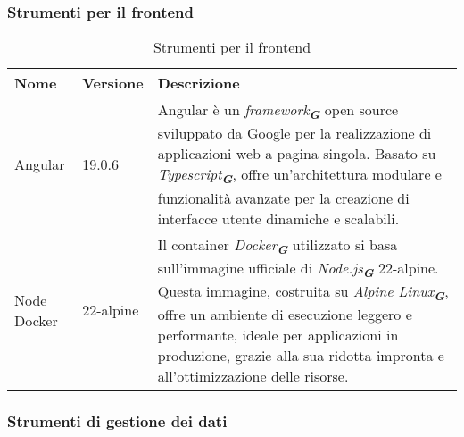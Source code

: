 \subsubsection{Strumenti per il frontend}
\label{subsec:strumenti_frontend}
\begin{table}[h!]
    \centering
    \renewcommand{\arraystretch}{1.6} %
    \begin{tabularx}{\textwidth}{|p{2cm}|p{2cm}|X|} \hline
    \rowcolor[HTML]{FFD700} 
    \textbf{Nome} & \textbf{Versione} & \textbf{Descrizione} \\ \hline
    Angular & 19.0.6 & Angular è un \emph{framework}\textsubscript{\textbf{\textit{G}}} open source sviluppato da Google per la realizzazione di applicazioni web a pagina singola. 
    Basato su \emph{Typescript}\textsubscript{\textbf{\textit{G}}}, offre un'architettura modulare e funzionalità avanzate per la creazione di interfacce utente dinamiche e scalabili. \\ \hline
    Node Docker & 22-alpine & Il container \emph{Docker}\textsubscript{\textbf{\textit{G}}} utilizzato si basa sull'immagine ufficiale di \emph{Node.js}\textsubscript{\textbf{\textit{G}}} 22-alpine. 
    Questa immagine, costruita su \emph{Alpine Linux}\textsubscript{\textbf{\textit{G}}}, offre un ambiente di esecuzione leggero e performante, ideale per applicazioni in produzione, 
    grazie alla sua ridotta impronta e all'ottimizzazione delle risorse. \\ \hline
    \end{tabularx}
    \caption{Strumenti per il frontend}
\end{table}

\subsubsection{Strumenti di gestione dei dati}
\label{subsec:strumenti_gestione_dati}

\newpage

